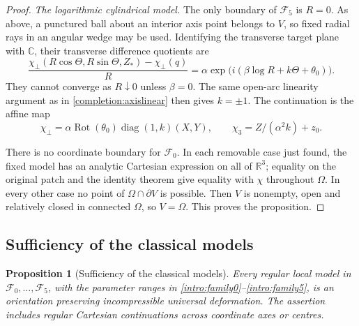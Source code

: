 \documentclass[11pt,a4paper]{article}
\numberwithin{equation}{section}
\theoremstyle{plain}
\newtheorem{proposition}[theorem]{Proposition}
\theoremstyle{definition}
\theoremstyle{remark}
\begin{document}
\begin{proof}
\emph{The logarithmic cylindrical model.}
The only boundary of $\mathcal F_5$ is $R=0$. As above, a punctured ball
about an interior axis point belongs to $V$, so fixed radial rays in
an angular wedge may be used. Identifying the transverse target plane
with $\mathbb C$, their transverse difference quotients are
\[
 \frac{\chi_\perp(R\cos\Theta,R\sin\Theta,Z_*)-\chi_\perp(q)}{R}
       =\alpha\exp\bigl(i(\beta\log R+k\Theta+\theta_0)\bigr).
\]
They cannot converge as $R\downarrow0$ unless $\beta=0$. The same
open-arc linearity argument as in \eqref{completion:axislinear} then
gives $k=\pm1$. The continuation is the affine map
\begin{equation}\label{completion:logremoval}
 \chi_\perp=\alpha\operatorname{Rot}(\theta_0)
                  \operatorname{diag}(1,k)(X,Y),\qquad
 \chi_3=Z/(\alpha^2k)+z_0.
\end{equation}

There is no coordinate boundary for $\mathcal F_0$. In each removable
case just found, the fixed model has an analytic Cartesian expression
on all of $\mathbb R^3$; equality on the original patch and the identity
theorem give equality with $\chi$ throughout $\Omega$. In every other
case no point of $\Omega\cap\partial V$ is possible. Then $V$ is
nonempty, open and relatively closed in connected $\Omega$, so
$V=\Omega$. This proves the proposition.
\end{proof}

\subsection{Sufficiency of the classical models}
\label{sec:classical-sufficiency}

\begin{proposition}[Sufficiency of the classical models]
\label{completion:sufficiency}
Every regular local model in
$\mathcal F_0,\ldots,\mathcal F_5$, with the parameter ranges
in \eqref{intro:family0}--\eqref{intro:family5}, is an
orientation preserving incompressible universal deformation.
The assertion includes regular Cartesian continuations across coordinate
axes or centres.
\end{proposition}
\end{document}
